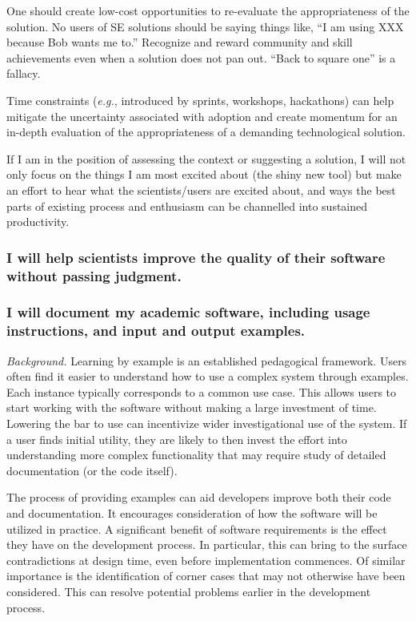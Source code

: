 \documentclass[a4paper,UKenglish]{dagman}
\renewcommand{\paragraph}[1]{\subsubsection*{#1}\xspace}
\newcommand{\eg}{\emph{e.g.},\xspace}
\begin{document}
One should create low-cost opportunities to re-evaluate the appropriateness of the solution.
No users of SE solutions should be saying things like, ``I am using XXX because Bob wants me to.''
Recognize and reward community and skill achievements even when a solution does not pan out.
``Back to square one'' is a fallacy. 

Time constraints (\eg introduced by sprints, workshops, hackathons) can help mitigate the uncertainty associated with adoption and create momentum for an in-depth evaluation of the appropriateness of a demanding technological solution.

If I am in the position of assessing the context or suggesting a solution, I will not only focus on the things I am most excited about (the shiny new tool) but make an effort to hear what the scientists/users are excited about, and ways the best parts of existing process and enthusiasm can be channelled into sustained productivity.

\paragraph{I will help scientists improve the quality of their software without passing judgment.}



\paragraph{I will document my academic software, including usage instructions, and input and output examples.}

\emph{Background.}
Learning by example is an established pedagogical framework. Users often find it easier to understand how to use a complex system through examples. Each instance typically corresponds to a common use case. This allows users to start working with the software without making a large investment of time. Lowering the bar to use can incentivize wider investigational use of the system. If a user finds initial utility, they are likely to then invest the effort into understanding more complex functionality that may require study of detailed documentation (or the code itself).

The process of providing examples can aid developers improve both their code and documentation. It encourages consideration of how the software will be utilized in practice. A significant benefit of software requirements is the effect they have on the development process. In particular, this can bring to the surface contradictions at design time, even before implementation commences. Of similar importance is the identification of corner cases that may not otherwise have been considered. This can resolve potential problems earlier in the development process.
\end{document}
